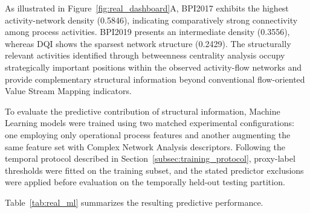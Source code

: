 As illustrated in Figure~\ref{fig:real_dashboard}A, BPI2017 exhibits the
highest activity-network density (0.5846), indicating comparatively strong
connectivity among process activities. BPI2019 presents an intermediate
density (0.3556), whereas DQI shows the sparsest network structure
(0.2429). The structurally relevant activities identified through
betweenness centrality analysis occupy strategically important positions
within the observed activity-flow networks and provide complementary
structural information beyond conventional flow-oriented Value Stream
Mapping indicators.

To evaluate the predictive contribution of structural information,
Machine Learning models were trained using two matched experimental
configurations: one employing only operational process features and another
augmenting the same feature set with Complex Network Analysis descriptors.
Following the temporal protocol described in
Section~\ref{subsec:training_protocol}, proxy-label thresholds were fitted on the training subset, and the stated
predictor exclusions were applied before evaluation on the temporally
held-out testing partition.

Table~\ref{tab:real_ml} summarizes the resulting predictive performance.


